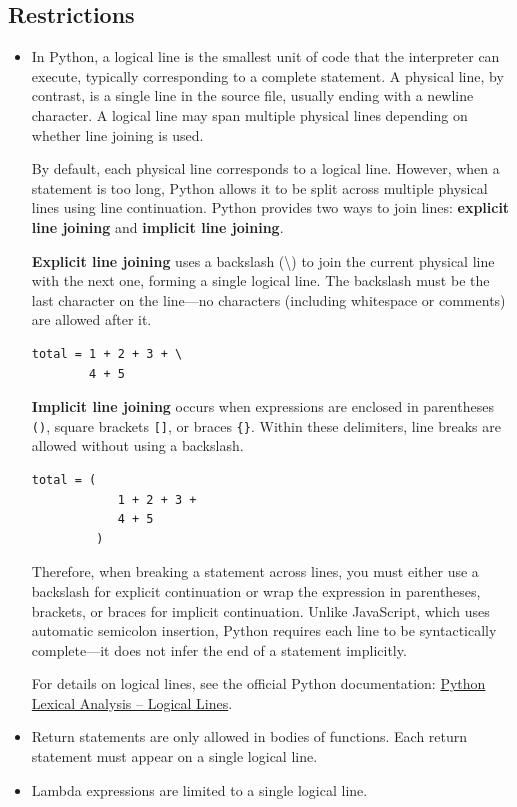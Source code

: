 \subsection*{Restrictions}

\begin{itemize}
\item In Python, a logical line is the smallest unit of code that the 
interpreter can execute, typically corresponding to a complete statement. 
A physical line, by contrast, is a single line in the source file, 
usually ending with a newline character. A logical line may span multiple 
physical lines depending on whether line joining is used.

By default, each physical line corresponds to a logical line. However, 
when a statement is too long, Python allows it to be split across multiple 
physical lines using line continuation. Python provides two ways to join 
lines: \textbf{explicit line joining} and \textbf{implicit line joining}.

\textbf{Explicit line joining} uses a backslash (\textbackslash) to join 
the current physical line with the next one, forming a single logical line. 
The backslash must be the last character on the line—no characters 
(including whitespace or comments) are allowed after it.

\begin{lstlisting}
total = 1 + 2 + 3 + \
        4 + 5
\end{lstlisting}

\textbf{Implicit line joining} occurs when expressions are enclosed in 
parentheses \texttt{()}, square brackets \texttt{[]}, or braces \texttt{\{\}}. 
Within these delimiters, line breaks are allowed without using a backslash.

\begin{lstlisting}
total = (
            1 + 2 + 3 +
            4 + 5
         )
\end{lstlisting}

Therefore, when breaking a statement across lines, you must either use a backslash for explicit continuation or wrap the expression in parentheses, brackets, or braces for implicit continuation. Unlike JavaScript, which uses automatic semicolon insertion, Python requires each line to be syntactically complete—it does not infer the end of a statement implicitly.

For details on logical lines, see the official Python documentation:
\href{https://docs.python.org/3/reference/lexical_analysis.html#logical-lines}{Python Lexical Analysis – Logical Lines}.


\item Return statements are only allowed in bodies of functions. Each return statement must appear on a single logical line.
\item Lambda expressions are limited to a single logical line.
\end{itemize}
